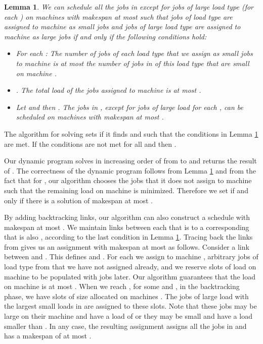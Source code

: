 \documentclass[11pt]{article}
\newtheorem{lemma}[theorem]{Lemma}
\begin{document}
\begin{lemma}\label{cond_lemma}
We can schedule all the jobs in  except for  jobs of large load type  (for each ) on machines  with makespan at most  such that  jobs of load type  are assigned to machine  as small jobs and  jobs of large load type  are assigned to machine  as large jobs if and only if the following conditions hold:

\begin{itemize}
\item For each : The number of jobs of each load type that we assign as small jobs to machine  is at most the number of jobs in  of this load type that are small on machine .
\item . The total load of the jobs assigned to  machine  is at most .
\item Let  and  then
.  The jobs in , except for  jobs of large load  for each ,  can be scheduled on machines  with makespan at most .
\end{itemize}

\end{lemma}

The algorithm for solving   sets  if it finds  and  such that the conditions in  Lemma \ref{cond_lemma} are met. If the conditions are not met for all  and  then .

Our dynamic program solves  in increasing order of  from  to  and returns the result of  .
The correctness of the dynamic program follows from Lemma \ref{cond_lemma} and from the fact that for , our algorithm chooses the jobs that it does not assign to machine  such that the remaining load on machine  is minimized. Therefore we set  if and only if there is a solution of makespan at most .

By adding backtracking links, our algorithm can also construct a schedule with makespan at most .
We maintain links between each  that is  to a corresponding  that is also , according to the last condition in Lemma \ref{cond_lemma}.
Tracing back the links from  gives us an assignment with makespan at most  as follows.
Consider a link between  and  . This defines  and .
For each  we assign to machine ,   arbitrary jobs of load type  from  that we have not assigned already, and we reserve  slots of load  on machine  to be populated with jobs later.
Our algorithm guarantees that the load on machine  is at most . When we reach , for some  and , in the backtracking phase, we have  slots of size  allocated on machines .
The  jobs of large load  with the largest small loads in  are assigned to these slots. Note that these jobs may be large on their machine and have a load of  or they may be small and have a load smaller than . In any case, the resulting assignment assigns all the jobs in  and has a makespan of at most .
\end{document}
